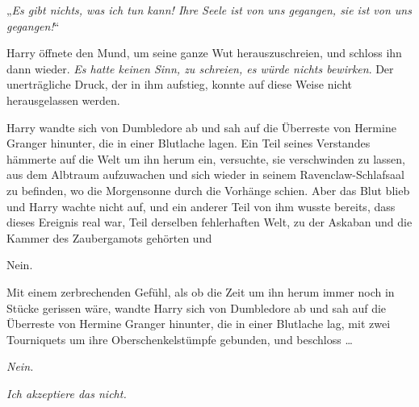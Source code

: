 „\emph{Es gibt nichts, was ich tun kann! Ihre Seele ist von uns gegangen, sie ist von uns gegangen!}“

Harry öffnete den Mund, um seine ganze Wut herauszuschreien, und schloss ihn dann wieder. \emph{Es hatte keinen Sinn, zu schreien, es würde nichts bewirken}. Der unerträgliche Druck, der in ihm aufstieg, konnte auf diese Weise nicht herausgelassen werden.

Harry wandte sich von Dumbledore ab und sah auf die Überreste von Hermine Granger hinunter, die in einer Blutlache lagen. Ein Teil seines Verstandes hämmerte auf die Welt um ihn herum ein, versuchte, sie verschwinden zu lassen, aus dem Albtraum aufzuwachen und sich wieder in seinem Ravenclaw-Schlafsaal zu befinden, wo die Morgensonne durch die Vorhänge schien. Aber das Blut blieb und Harry wachte nicht auf, und ein anderer Teil von ihm wusste bereits, dass dieses Ereignis real war, Teil derselben fehlerhaften Welt, zu der Askaban und die Kammer des Zaubergamots gehörten und

Nein.

Mit einem zerbrechenden Gefühl, als ob die Zeit um ihn herum immer noch in Stücke gerissen wäre, wandte Harry sich von Dumbledore ab und sah auf die Überreste von Hermine Granger hinunter, die in einer Blutlache lag, mit zwei Tourniquets um ihre Oberschenkelstümpfe gebunden, und beschloss …

\emph{Nein.}

\emph{Ich akzeptiere das nicht.}

